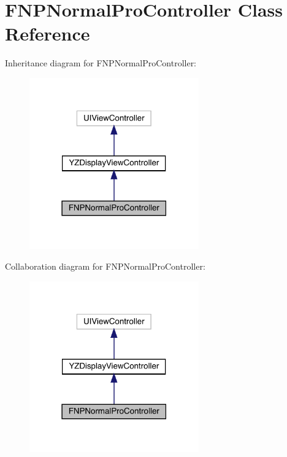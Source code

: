 \hypertarget{interface_f_n_p_normal_pro_controller}{}\section{F\+N\+P\+Normal\+Pro\+Controller Class Reference}
\label{interface_f_n_p_normal_pro_controller}


Inheritance diagram for F\+N\+P\+Normal\+Pro\+Controller\+:\nopagebreak
\begin{figure}[H]
\begin{center}
\leavevmode
\includegraphics[width=207pt]{interface_f_n_p_normal_pro_controller__inherit__graph}
\end{center}
\end{figure}


Collaboration diagram for F\+N\+P\+Normal\+Pro\+Controller\+:\nopagebreak
\begin{figure}[H]
\begin{center}
\leavevmode
\includegraphics[width=207pt]{interface_f_n_p_normal_pro_controller__coll__graph}
\end{center}
\end{figure}
